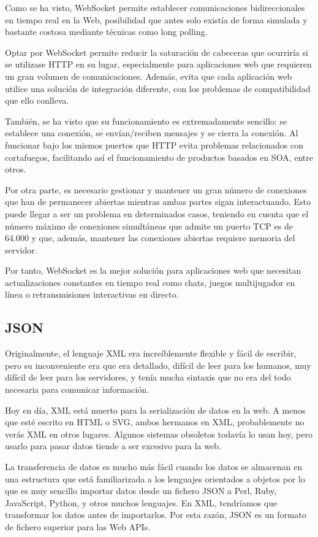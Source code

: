 Como se ha visto, WebSocket permite establecer comunicaciones bidireccionales en tiempo real en la Web, posibilidad que antes solo existía de forma simulada y bastante costosa mediante técnicas como long polling.

Optar por WebSocket permite reducir la saturación de cabeceras que ocurriría si se utilizase HTTP en su lugar, especialmente para aplicaciones web que requieren un gran volumen de comunicaciones. Además, evita que cada aplicación web utilice una solución de integración diferente, con los problemas de compatibilidad que ello conlleva.

También, se ha visto que su funcionamiento es extremadamente sencillo: se establece una conexión, se envían/reciben mensajes y se cierra la conexión. Al funcionar bajo los mismos puertos que HTTP evita problemas relacionados con cortafuegos, facilitando así el funcionamiento de productos basados en SOA, entre otros.

Por otra parte, es necesario gestionar y mantener un gran número de conexiones que han de permanecer abiertas mientras ambas partes sigan interactuando. Esto puede llegar a ser un problema en determinados casos, teniendo en cuenta que el número máximo de conexiones simultáneas que admite un puerto TCP es de 64.000 y que, además, mantener las conexiones abiertas requiere memoria del servidor.

Por tanto, WebSocket es la mejor solución para aplicaciones web que necesitan actualizaciones constantes en tiempo real como chats, juegos multijugador en línea o retransmisiones interactivas en directo.

\subsection{JSON}

Originalmente, el lenguaje XML era increíblemente flexible y fácil de escribir, pero su inconveniente era que era detallado, difícil de leer para los humanos, muy difícil de leer para los servidores, y tenía mucha sintaxis que no era del todo necesaria para comunicar información.

Hoy en día, XML está muerto para la serialización de datos en la web. A menos que esté escrito en HTML o SVG, ambos hermanos en XML, probablemente no verás XML en otros lugares. Algunos sistemas obsoletos todavía lo usan hoy, pero usarlo para pasar datos tiende a ser excesivo para la web.

La transferencia de datos es mucho más fácil cuando los datos se almacenan en una estructura que está familiarizada a los lenguajes orientados a objetos por lo que es muy sencillo importar datos desde un fichero JSON a Perl, Ruby, JavaScript, Python, y otros muchos lenguajes. En XML, tendríamos que transformar los datos antes de importarlos. Por esta razón, JSON es un formato de fichero superior para las Web APIs.

